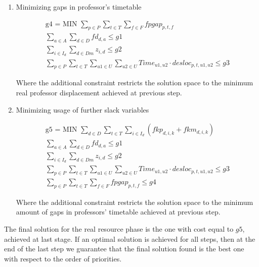 \begin{enumerate}
\item{Minimizing gaps in professor's timetable}

\begin{align*}
   \mbox{g4 = MIN  } \sum\limits_{p \in P} \sum\limits_{t \in T} \sum\limits_{f \in F} fpgap_{p,t,f}
	\\
	\sum\limits_{a \in A}\sum\limits_{d \in D} fd_{d,a} \le g1
	\\
	\sum\limits_{i \in I_{d}} \sum\limits_{d \in Dm} z_{i,d} \le g2
	\\
	\sum\limits_{p \in P} \sum\limits_{t \in T} \sum\limits_{u1 \in U} \sum\limits_{u2 \in U} Time_{u1,u2} \cdot desloc_{p,t,u1,u2} \le g3
\end{align*}

Where the additional constraint restricts the solution space to the minimum real professor displacement achieved at previous step.

\item{Minimizing usage of further slack variables}

\begin{align*}
   \mbox{g5 = MIN  } \sum\limits_{d \in D} \sum\limits_{t \in T} \sum\limits_{i \in I_{d}} (fkp_{d,i,k} + fkm_{d,i,k})
	\\
	\sum\limits_{a \in A}\sum\limits_{d \in D} fd_{d,a} \le g1
	\\
	\sum\limits_{i \in I_{d}} \sum\limits_{d \in Dm} z_{i,d} \le g2
	\\
	\sum\limits_{p \in P} \sum\limits_{t \in T} \sum\limits_{u1 \in U} \sum\limits_{u2 \in U} Time_{u1,u2} \cdot desloc_{p,t,u1,u2} \le g3
	\\
	\sum\limits_{p \in P} \sum\limits_{t \in T} \sum\limits_{f \in F} fpgap_{p,t,f} \le g4
\end{align*}

Where the additional constraint restricts the solution space to the minimum amount of gaps in professors' timetable achieved at previous step.

\end{enumerate}


The final solution for the real resource phase is the one with cost equal to $g5$, achieved at last stage. If an optimal solution is achieved for all steps, then at the end of the last step we guarantee that the final solution found is the best one with respect to the order of priorities.


